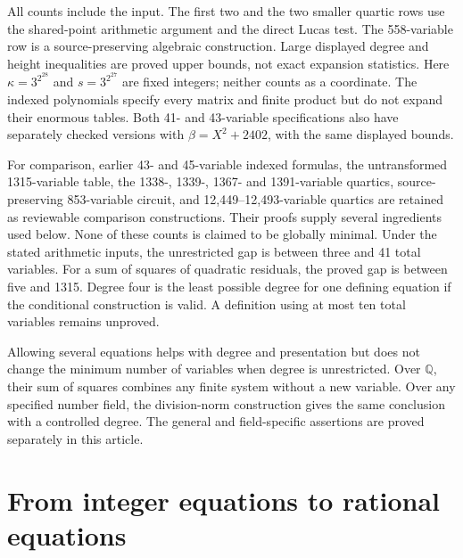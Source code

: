 \documentclass[11pt]{article}
\theoremstyle{definition}
\begin{document}
All counts include the input. The first two and the two smaller quartic
rows use the shared-point arithmetic argument and the direct Lucas
test. The 558-variable row is a source-preserving algebraic
construction. Large displayed degree and height inequalities are proved
upper bounds, not exact expansion statistics. Here
$\kappa=3^{2^{28}}$ and $s=3^{2^{27}}$ are fixed integers;
neither counts as a coordinate. The indexed polynomials specify every
matrix and finite product but do not expand their enormous tables.
Both 41- and 43-variable specifications also have separately checked
versions with $\beta=X^2+2402$, with the same displayed bounds.

For comparison, earlier 43- and 45-variable indexed formulas, the untransformed
1315-variable table, the 1338-, 1339-, 1367- and 1391-variable quartics,
source-preserving 853-variable circuit, and
12,449--12,493-variable quartics are retained as reviewable comparison
constructions. Their proofs supply several ingredients used below.
None of these counts is claimed to be globally minimal. Under the
stated arithmetic inputs, the unrestricted gap is between three and
41 total variables. For a sum of squares of quadratic residuals, the
proved gap is between five and 1315. Degree four is the least possible
degree for one defining equation if the conditional construction is
valid. A definition using at most ten total variables remains unproved.

Allowing several equations helps with degree and presentation but
does not change the minimum number of variables when degree is
unrestricted. Over $\mathbb Q$, their sum of squares combines any
finite system without a new variable. Over any specified number field,
the division-norm construction gives the same conclusion with a
controlled degree. The general and field-specific assertions are
proved separately in this article.

\section{From integer equations to rational equations}
\label{sec:reduction}
\end{document}
